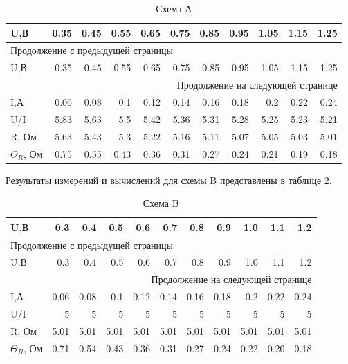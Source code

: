 \documentclass[14pt]{extarticle}
\begin{document}
\begin{longtable}{|l|r|r|r|r|r|r|r|r|r|r|}
\caption{\label{tab:org2f91a8e}Схема А}
\\[0pt]
\hline
U,В & 0.35 & 0.45 & 0.55 & 0.65 & 0.75 & 0.85 & 0.95 & 1.05 & 1.15 & 1.25\\[0pt]
\hline
\endfirsthead
\multicolumn{11}{l}{Продолжение с предыдущей страницы} \\[0pt]
\hline

U,В & 0.35 & 0.45 & 0.55 & 0.65 & 0.75 & 0.85 & 0.95 & 1.05 & 1.15 & 1.25 \\[0pt]

\hline
\endhead
\hline\multicolumn{11}{r}{Продолжение на следующей странице} \\
\endfoot
\endlastfoot
\hline
I,А & 0.06 & 0.08 & 0.1 & 0.12 & 0.14 & 0.16 & 0.18 & 0.2 & 0.22 & 0.24\\[0pt]
\hline
U/I & 5.83 & 5.63 & 5.5 & 5.42 & 5.36 & 5.31 & 5.28 & 5.25 & 5.23 & 5.21\\[0pt]
\hline
R, Ом & 5.63 & 5.43 & 5.3 & 5.22 & 5.16 & 5.11 & 5.07 & 5.05 & 5.03 & 5.01\\[0pt]
\hline
\(\Theta_R\), Ом & 0.75 & 0.55 & 0.43 & 0.36 & 0.31 & 0.27 & 0.24 & 0.21 & 0.19 & 0.18\\[0pt]
\hline
\end{longtable}

Результаты измерений и вычислений для схемы B представлены в таблице \ref{tab:orgc24c634}.


\begin{longtable}{|l|r|r|r|r|r|r|r|r|r|r|}
\caption{\label{tab:orgc24c634}Схема B}
\\[0pt]
\hline
U,В & 0.3 & 0.4 & 0.5 & 0.6 & 0.7 & 0.8 & 0.9 & 1.0 & 1.1 & 1.2\\[0pt]
\hline
\endfirsthead
\multicolumn{11}{l}{Продолжение с предыдущей страницы} \\[0pt]
\hline

U,В & 0.3 & 0.4 & 0.5 & 0.6 & 0.7 & 0.8 & 0.9 & 1.0 & 1.1 & 1.2 \\[0pt]

\hline
\endhead
\hline\multicolumn{11}{r}{Продолжение на следующей странице} \\
\endfoot
\endlastfoot
\hline
I,А & 0.06 & 0.08 & 0.1 & 0.12 & 0.14 & 0.16 & 0.18 & 0.2 & 0.22 & 0.24\\[0pt]
\hline
U/I & 5 & 5 & 5 & 5 & 5 & 5 & 5 & 5 & 5 & 5\\[0pt]
\hline
R, Ом & 5.01 & 5.01 & 5.01 & 5.01 & 5.01 & 5.01 & 5.01 & 5.01 & 5.01 & 5.01\\[0pt]
\hline
\(\Theta_R\), Ом & 0.71 & 0.54 & 0.43 & 0.36 & 0.31 & 0.27 & 0.24 & 0.22 & 0.20 & 0.18\\[0pt]
\hline
\end{longtable}
\end{document}
